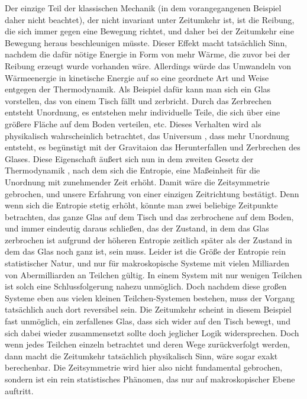 \documentclass[12pt,a4paper]{scrartcl}
\numberwithin{equation}{section}
\begin{document}
Der einzige Teil der klassischen Mechanik (in dem vorangegangenen Beispiel daher nicht beachtet), der nicht invariant unter Zeitumkehr ist, ist die Reibung, die sich immer gegen eine Bewegung richtet, und daher bei der Zeitumkehr eine Bewegung \grqq{} heraus beschleunigen müsste. Dieser Effekt macht tatsächlich Sinn, nachdem die dafür nötige Energie in Form von mehr Wärme, die zuvor bei der Reibung erzeugt wurde vorhanden wäre. Allerdings würde das Umwandeln von Wärmeenergie in kinetische Energie auf so eine geordnete Art und Weise entgegen der Thermodynamik. Als Beispiel dafür kann man sich ein Glas vorstellen, das von einem Tisch fällt und zerbricht. Durch das Zerbrechen entsteht Unordnung, es entstehen mehr individuelle Teile, die sich über eine größere Fläche auf dem Boden verteilen, etc. Dieses Verhalten wird als physikalisch wahrscheinlich betrachtet, das Universum \grqq{}, dass mehr Unordnung entsteht, es begünstigt mit der Gravitaion das Herunterfallen und Zerbrechen des Glases. Diese Eigenschaft äußert sich nun in dem zweiten Gesetz der Thermodynamik \cite{pfennig12}, nach dem sich die Entropie, eine Maßeinheit für die Unordnung mit zunehmender Zeit erhöht. Damit wäre die Zeitsymmetrie gebrochen, und unsere Erfahrung von einer einzigen Zeitrichtung bestätigt. Denn wenn sich die Entropie stetig erhöht, könnte man zwei beliebige Zeitpunkte betrachten, das ganze Glas auf dem Tisch und das zerbrochene auf dem Boden, und immer eindeutig daraus schließen, das der Zustand, in dem das Glas zerbrochen ist aufgrund der höheren Entropie zeitlich später als der Zustand in dem das Glas noch ganz ist, sein muss. Leider ist die Größe der Entropie rein statistischer Natur, und nur für makroskopische Systeme mit vielen Milliarden von Abermilliarden an Teilchen gültig. In einem System mit nur wenigen Teilchen ist solch eine Schlussfolgerung nahezu unmöglich. Doch nachdem diese großen Systeme eben aus vielen kleinen Teilchen-Systemen bestehen, muss der Vorgang tatsächlich auch dort reversibel sein. Die Zeitumkehr scheint in diesem Beispiel fast unmöglich, ein zerfallenes Glas, dass sich wider auf den Tisch bewegt, und sich dabei wieder zusammensetzt sollte doch jeglicher Logik widersprechen. Doch wenn jedes Teilchen einzeln betrachtet und deren Wege zurückverfolgt werden, dann macht die Zeitumkehr tatsächlich physikalisch Sinn, wäre sogar exakt berechenbar. Die Zeitsymmetrie wird hier also nicht fundamental gebrochen, sondern ist ein rein statistisches Phänomen, das nur auf makroskopischer Ebene auftritt.\cite{aue08}
\end{document}
